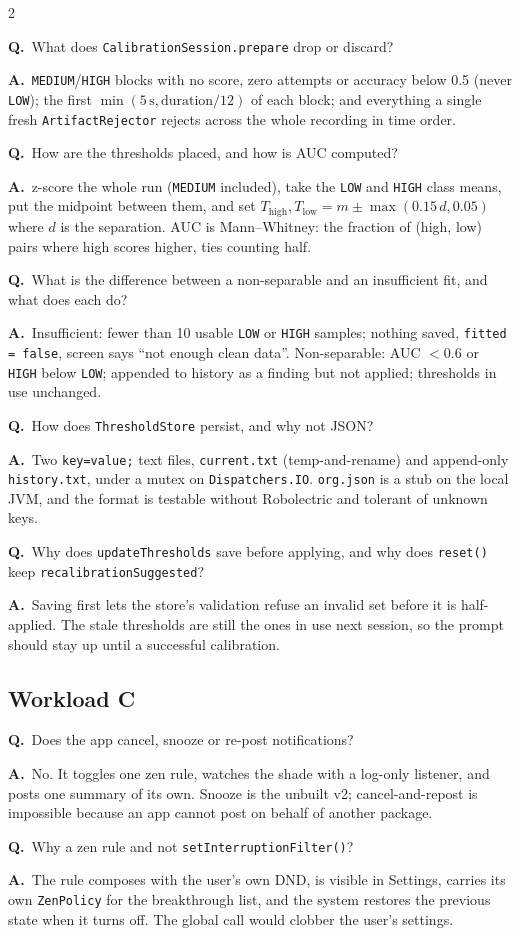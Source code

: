 \documentclass[10pt,a4paper]{article}
\newcommand{\code}[1]{\texttt{#1}}                  %
\newcommand{\Thigh}{T_{\mathrm{high}}}
\newcommand{\Tlow}{T_{\mathrm{low}}}
\newcounter{qnum}
\newcommand{\Q}[2]{\stepcounter{qnum}\par\medskip\noindent
  \textbf{Q\theqnum.}\ #1\par\nobreak\smallskip\noindent
  {\color{teal}\textbf{A.}}\ #2\par}
\begin{document}
\begin{multicols}{2}
\Q{What does \code{CalibrationSession.prepare} drop or discard?}{\code{MEDIUM}/\code{HIGH} blocks
with no score, zero attempts or accuracy below 0.5 (never \code{LOW}); the first
$\min(5\,\text{s}, \text{duration}/12)$ of each block; and everything a single fresh
\code{ArtifactRejector} rejects across the whole recording in time order.}

\Q{How are the thresholds placed, and how is AUC computed?}{z-score the whole run (\code{MEDIUM}
included), take the \code{LOW} and \code{HIGH} class means, put the midpoint between them, and set
$\Thigh,\Tlow = m \pm \max(0.15\,d, 0.05)$ where $d$ is the separation. AUC is Mann--Whitney: the
fraction of (high, low) pairs where high scores higher, ties counting half.}

\Q{What is the difference between a non-separable and an insufficient fit, and what does each do?}
{Insufficient: fewer than 10 usable \code{LOW} or \code{HIGH} samples; nothing saved,
\code{fitted = false}, screen says ``not enough clean data''. Non-separable: AUC $< 0.6$ or
\code{HIGH} below \code{LOW}; appended to history as a finding but not applied; thresholds in
use unchanged.}

\Q{How does \code{ThresholdStore} persist, and why not JSON?}{Two \code{key=value;} text files,
\code{current.txt} (temp-and-rename) and append-only \code{history.txt}, under a mutex on
\code{Dispatchers.IO}. \code{org.json} is a stub on the local JVM, and the format is testable
without Robolectric and tolerant of unknown keys.}

\Q{Why does \code{updateThresholds} save before applying, and why does \code{reset()} keep
\code{recalibrationSuggested}?}{Saving first lets the store's validation refuse an invalid set
before it is half-applied. The stale thresholds are still the ones in use next session, so the
prompt should stay up until a successful calibration.}

\subsection*{Workload C}

\Q{Does the app cancel, snooze or re-post notifications?}{No. It toggles one zen rule, watches
the shade with a log-only listener, and posts one summary of its own. Snooze is the unbuilt v2;
cancel-and-repost is impossible because an app cannot post on behalf of another package.}

\Q{Why a zen rule and not \code{setInterruptionFilter()}?}{The rule composes with the user's own
DND, is visible in Settings, carries its own \code{ZenPolicy} for the breakthrough list, and the
system restores the previous state when it turns off. The global call would clobber the user's
settings.}


\end{multicols}
\end{document}
